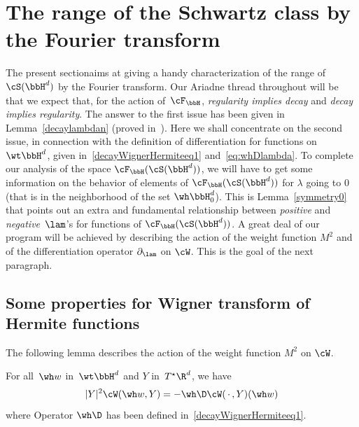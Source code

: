 \section{The range of the Schwartz class by the Fourier transform}\label{rangeofcS}

The present sectionaims at giving a handy characterization of the range of $\cS(\bbH^d)$ by the Fourier transform. Our Ariadne thread throughout will be that we expect that, for the action of~$\cF_\bbH$,
\emph{regularity implies decay} and \emph{decay implies regularity}. The answer to the first issue has been given in Lemma~\ref{decaylambdan} (proved in~\cite {bcdFHspace}). Here we shall concentrate on the second issue, in connection with the definition of differentiation for functions on $\wt\bbH^d$, given in~\eqref{decayWignerHermiteeq1} and~\eqref{eq:whDlambda}. To complete our analysis of the space $\cF_\bbH(\cS(\bbH^d))$, we will have to get some information on the behavior of elements of $\cF_\bbH(\cS(\bbH^d))$ for $\lambda$ going to $0$ (that is in the neighborhood of the set $\wh\bbH^d_0$). This is Lemma~\ref{symmetry0} that points out an extra and fundamental relationship between \emph{positive} and \emph{negative}~$\lam$'s for functions of $\cF_\bbH(\cS(\bbH^d))$.
\smallbreak A great deal of our program will be achieved by describing the action of the weight function $M^2$ and of the differentiation operator $\partial_\lam$ on $\cW$. This is the goal of the next paragraph.


\subsection{Some properties for Wigner transform of Hermite functions}


The following lemma describes the action of the weight function $M^2$ on $\cW$.

\begin{lemm}\label{Y2WignerHermite}
For all~$\wh w$ in~$\wt\bbH^d$ and $Y$ in~$ T^\star\R^d$, we have
\[
|Y|^2\cW(\wh w,Y) = -\wh\D \cW({\,\cdot\,},Y) (\wh w)
\]
where Operator $\wh\D$ has been defined in~\eqref{decayWignerHermiteeq1}.
\end{lemm}

